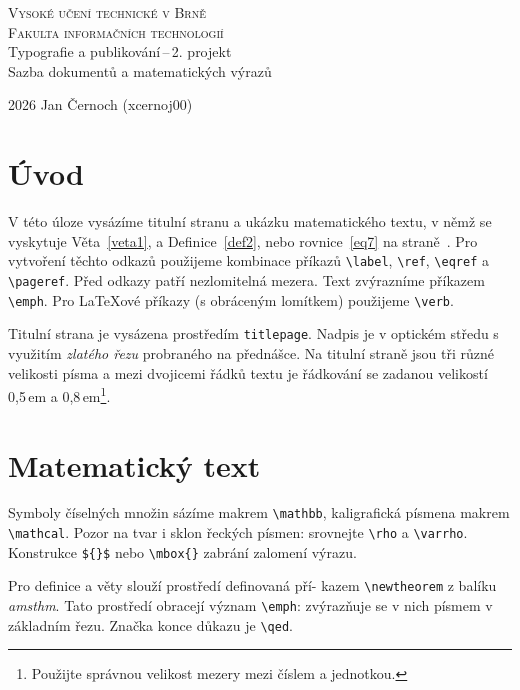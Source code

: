 \documentclass[a4paper,11pt,twocolumn]{article}
\begin{document}
    \begin{titlepage}
        \begin{center}
            \Huge
            \textsc{Vysoké učení technické v Brně} \\
            \vspace{0.5 em}
            \textsc{\huge{Fakulta informačních technologií}} \\
            \huge
            Typografie a publikování\,--\,2. projekt \\
            \vspace{0.8 em}
            Sazba dokumentů a matematických výrazů
        \end{center}

        {\Large 2026 \hfill Jan Černoch (xcernoj00)}
    \end{titlepage}

\section*{Úvod}
V této úloze vysázíme titulní stranu a ukázku matematického textu, v němž se vyskytuje Věta~\ref{veta1}, a Definice~\ref{def2}, nebo rovnice~\eqref{eq7} na straně~\pageref{eq7}. Pro vytvoření těchto odkazů použijeme kombinace příkazů \verb|\label|, \verb|\ref|, \verb|\eqref| a \verb|\pageref|. Před odkazy patří nezlomitelná mezera. Text zvýrazníme příkazem \verb|\emph|. Pro \LaTeX ové příkazy (s obráceným lomítkem) použijeme \verb|\verb|. 

Titulní strana je vysázena prostředím \verb|titlepage|. Nadpis je v optickém středu s využitím \emph{zlatého řezu} probraného na přednášce. Na titulní straně jsou tři různé velikosti písma a mezi dvojicemi řádků textu je řádkování se zadanou velikostí 0,5\,em a 0,8\,em\footnote{Použijte správnou velikost mezery mezi číslem a jednotkou.}.

\section{Matematický text}
Symboly číselných množin sázíme makrem \verb|\mathbb|, kaligrafická písmena makrem \verb|\mathcal|. Pozor na tvar i sklon řeckých písmen: srovnejte \verb|\rho| a \verb|\varrho|. Konstrukce \verb|${}$| nebo \verb|\mbox{}| zabrání zalomení výrazu.

Pro definice a věty slouží prostředí definovaná pří-
kazem \verb|\newtheorem| z balíku \emph{amsthm}. Tato prostředí obracejí význam \verb|\emph|: zvýrazňuje se v nich písmem v základním řezu. Značka konce důkazu je \verb|\qed|.
\end{document}
